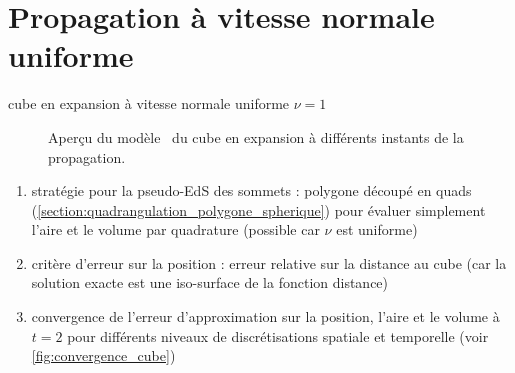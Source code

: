 \section{Propagation à vitesse normale uniforme}
cube en expansion à vitesse normale uniforme $\nu = 1$

\begin{figure}
	\centering
	\newdimen\imwid
	\linewidth
	\caption{Aperçu du modèle \brep\ du cube en expansion à différents instants de la propagation.}
	\label{fig:snapshots_cube}
\end{figure}

\begin{enumerate}
	\item stratégie pour la pseudo-EdS des sommets : polygone découpé en quads (\cf \autoref{section:quadrangulation_polygone_spherique}) pour évaluer simplement l'aire et le volume par quadrature (possible car $\nu$ est uniforme)
	\item critère d'erreur sur la position : erreur relative sur la distance au cube (car la solution exacte est une iso-surface de la fonction distance)
	\item convergence de l'erreur d'approximation sur la position, l'aire et le volume à $t = 2$ pour différents niveaux de discrétisations spatiale et temporelle (voir \autoref{fig:convergence_cube})
\end{enumerate}



